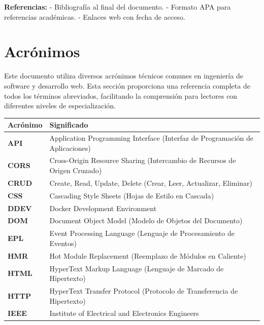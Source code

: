 \documentclass[12pt,a4paper,oneside]{report}
\begin{document}
\textbf{Referencias:} - Bibliografía al final del documento. - Formato
APA para referencias académicas. - Enlaces web con fecha de acceso.

\section{Acrónimos}\label{acruxf3nimos}

Este documento utiliza diversos acrónimos técnicos comunes en ingeniería de software y desarrollo web. Esta sección proporciona una referencia completa de todos los términos abreviados, facilitando la comprensión para lectores con diferentes niveles de especialización.


\begin{longtable}[]{@{}
  >{\raggedright\arraybackslash}p{}
  >{\raggedright\arraybackslash}p{}@{}}
\toprule\noalign{}
\begin{minipage}[b]{\linewidth}\raggedright
Acrónimo
\end{minipage} & \begin{minipage}[b]{\linewidth}\raggedright
Significado
\end{minipage} \\
\midrule\noalign{}
\endhead
\bottomrule\noalign{}
\endlastfoot
\textbf{API} & Application Programming Interface (Interfaz de
Programación de Aplicaciones) \\
\textbf{CORS} & Cross-Origin Resource Sharing (Intercambio de Recursos
de Origen Cruzado) \\
\textbf{CRUD} & Create, Read, Update, Delete (Crear, Leer, Actualizar,
Eliminar) \\
\textbf{CSS} & Cascading Style Sheets (Hojas de Estilo en Cascada) \\
\textbf{DDEV} & Docker Development Environment \\
\textbf{DOM} & Document Object Model (Modelo de Objetos del
Documento) \\
\textbf{EPL} & Event Processing Language (Lenguaje de Procesamiento de
Eventos) \\
\textbf{HMR} & Hot Module Replacement (Reemplazo de Módulos en
Caliente) \\
\textbf{HTML} & HyperText Markup Language (Lenguaje de Marcado de
Hipertexto) \\
\textbf{HTTP} & HyperText Transfer Protocol (Protocolo de Transferencia
de Hipertexto) \\
\textbf{IEEE} & Institute of Electrical and Electronics Engineers \\

\end{longtable}
\end{document}
